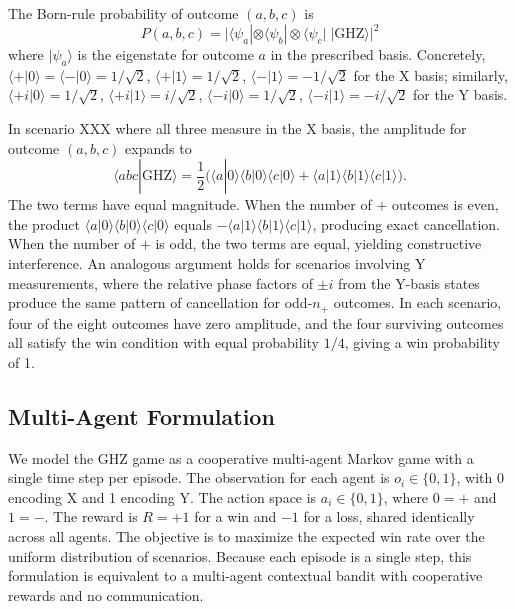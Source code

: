 \documentclass[journal]{IEEEtran}
\begin{document}
The Born-rule probability of outcome $(a,b,c)$ is
\begin{equation}
    P(a,b,c) = \bigl|\langle \psi_a| \otimes \langle \psi_b| \otimes \langle \psi_c| \; |\text{GHZ}\rangle \bigr|^2
\end{equation}
where $|\psi_a\rangle$ is the eigenstate for outcome $a$ in the prescribed basis. Concretely, $\langle +|0\rangle = \langle -|0\rangle = 1/\sqrt{2}$, $\langle +|1\rangle = 1/\sqrt{2}$, $\langle -|1\rangle = -1/\sqrt{2}$ for the X basis; similarly, $\langle +i|0\rangle = 1/\sqrt{2}$, $\langle +i|1\rangle = i/\sqrt{2}$, $\langle -i|0\rangle = 1/\sqrt{2}$, $\langle -i|1\rangle = -i/\sqrt{2}$ for the Y basis.

In scenario XXX where all three measure in the X basis, the amplitude for outcome $(a,b,c)$ expands to
\begin{equation}
    \langle abc|\text{GHZ}\rangle = \frac{1}{2}\bigl(\langle a|0\rangle\langle b|0\rangle\langle c|0\rangle + \langle a|1\rangle\langle b|1\rangle\langle c|1\rangle\bigr).
\end{equation}
The two terms have equal magnitude. When the number of $+$ outcomes is even, the product $\langle a|0\rangle\langle b|0\rangle\langle c|0\rangle$ equals $-\langle a|1\rangle\langle b|1\rangle\langle c|1\rangle$, producing exact cancellation. When the number of $+$ is odd, the two terms are equal, yielding constructive interference. An analogous argument holds for scenarios involving Y measurements, where the relative phase factors of $\pm i$ from the Y-basis states produce the same pattern of cancellation for odd-$n_+$ outcomes. In each scenario, four of the eight outcomes have zero amplitude, and the four surviving outcomes all satisfy the win condition with equal probability $1/4$, giving a win probability of 1.

\subsection{Multi-Agent Formulation}

We model the GHZ game as a cooperative multi-agent Markov game with a single time step per episode. The observation for each agent is $o_i \in \{0, 1\}$, with 0 encoding X and 1 encoding Y. The action space is $a_i \in \{0, 1\}$, where $0 = +$ and $1 = -$. The reward is $R = +1$ for a win and $-1$ for a loss, shared identically across all agents. The objective is to maximize the expected win rate over the uniform distribution of scenarios. Because each episode is a single step, this formulation is equivalent to a multi-agent contextual bandit with cooperative rewards and no communication.
\end{document}
